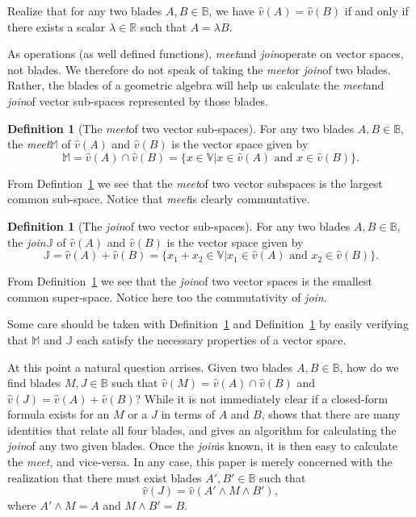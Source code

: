 \documentclass{birkjour}
\theoremstyle{definition}
\newtheorem{defn}[thm]{Definition}
\theoremstyle{remark}
\numberwithin{equation}{section}
\newcommand{\R}{\mathbb{R}}
\newcommand{\B}{\mathbb{B}}
\newcommand{\V}{\mathbb{V}}
\newcommand{\M}{\mathbb{M}}
\newcommand{\J}{\mathbb{J}}
\newcommand{\meet}{{\it meet}\;}
\newcommand{\join}{{\it join}\;}
\newcommand{\vh}{\hat{v}}
\begin{document}
Realize that for any two blades $A,B\in\B$, we have $\vh(A)=\vh(B)$ if and only if
there exists a scalar $\lambda\in\R$ such that $A=\lambda B$.

As operations (as well defined functions), \meet and \join operate on vector spaces, not blades.
We therefore do not speak of taking the \meet or \join of two blades.  Rather, the blades of a geometric
algebra will help us calculate the \meet and \join of vector sub-spaces represented by those blades.

\begin{defn}[The \meet of two vector sub-spaces]\label{def_meet}
For any two blades $A,B\in\B$, the \meet $\M$ of $\vh(A)$ and $\vh(B)$ is the
vector space given by
\begin{equation}
\M = \vh(A)\cap \vh(B) = \{x\in\V|\mbox{$x\in\vh(A)$ and $x\in\vh(B)$}\}.
\end{equation}
\end{defn}
From Defintion~\ref{def_meet} we see that the \meet of two vector subspaces
is the largest common sub-space.  Notice that \meet is clearly communtative.

\begin{defn}[The \join of two vector sub-spaces]\label{def_join}
For any two blades $A,B\in\B$, the \join $\J$ of $\vh(A)$ and $\vh(B)$ is the
vector space given by
\begin{equation}
\J = \vh(A)+\vh(B) = \{x_1+x_2\in\V|\mbox{$x_1\in\vh(A)$ and $x_2\in\vh(B)$}\}.
\end{equation}
\end{defn}
From Definition~\ref{def_join} we see that the \join of two vector spaces
is the smallest common super-space.  Notice here too the commutativity of \join.

Some care should be taken with Definition~\ref{def_meet} and
Definition~\ref{def_join} by easily verifying that $\M$ and $\J$ each satisfy the
necessary properties of a vector space.

At this point a natural question arrises.  Given two blades $A,B\in\B$, how do we find blades
$M,J\in\B$ such that $\vh(M)=\vh(A)\cap\vh(B)$ and $\vh(J)=\vh(A)+\vh(B)$?
While it is not immediately clear if a closed-form formula exists for an $M$ or a $J$ in terms
of $A$ and $B$, \cite{} shows that there are many identities that relate all four blades,
and \cite{} gives an algorithm for calculating the \join of any two given blades.  Once the
\join is known, it is then easy to calculate the \meet, and vice-versa.
In any case, this paper is merely concerned with the realization that
there must exist blades $A',B'\in\B$ such that
\begin{equation}
\vh(J) = \vh(A'\wedge M\wedge B'),
\end{equation}
where $A'\wedge M=A$ and $M\wedge B'=B$.
\end{document}
